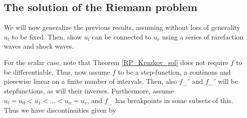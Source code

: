 \documentclass{article}
\numberwithin{equation}{section}
\begin{document}



\subsection{The solution of the Riemann problem}
We will now generalize the previous results, assuming without loss of generality $u_l$ to be fixed. Then, show $u_l$ can be connected to $u_r$ using a series of rarefaction waves and shock waves. 

For the scalar case, note that Theorem \ref{RP_Kruzkov_sol} does not require $f$ to be differentiable. Thus, now assume $f$ to be a step-function, a continous and piecewise linear on a finite number of intervals. Then, also $f_{\smile}'$ and $f_{\frown}'$ will be stepfunctions, as will their inverses. Furthermore, assume $u_l = u_0 < u_1 < \dots < u_n = u_r$, and $f_\smile$ has breakpoints in some subsets of this. Thus we have discontinuities given by 
\end{document}
